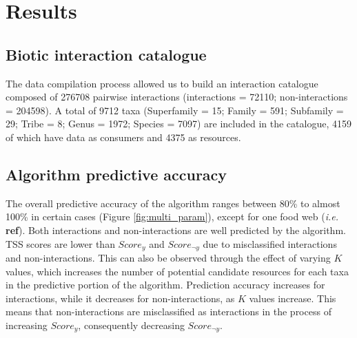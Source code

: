 \documentclass[letterpaper]{article}
\begin{document}

\section{Results}
    \subsection{Biotic interaction catalogue}
The data compilation process allowed us to build an interaction catalogue composed of 276708 pairwise interactions (interactions = 72110; non-interactions = 204598). A total of 9712 taxa (Superfamily = 15; Family = 591; Subfamily = 29; Tribe = 8; Genus = 1972; Species = 7097) are included in the catalogue, 4159 of which have data as consumers and 4375 as resources.

    \subsection{Algorithm predictive accuracy}
The overall predictive accuracy of the algorithm ranges between 80\% to almost 100\% in certain cases (Figure \ref{fig:multi_param}), except for one food web (\textit{i.e.} \textbf{ref}). Both interactions and non-interactions are well predicted by the algorithm. TSS scores are lower than $Score_y$ and $Score_{\neg y}$ due to misclassified interactions and non-interactions. This can also be observed through the effect of varying $K$ values, which increases the number of potential candidate resources for each taxa in the predictive portion of the algorithm. Prediction accuracy increases for interactions, while it decreases for non-interactions, as $K$ values increase. This means that non-interactions are misclassified as interactions in the process of increasing $Score_y$, consequently decreasing $Score_{\neg y}$.
\end{document}
